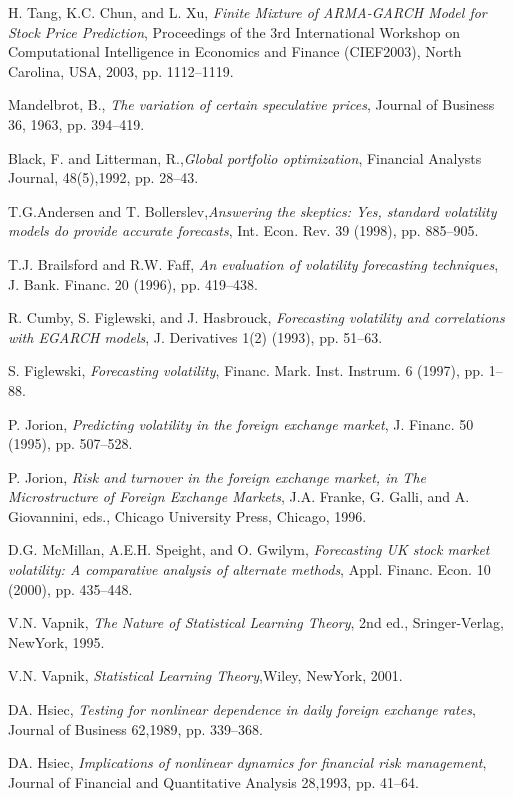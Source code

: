\begin{thebibliography}{9}
H. Tang, K.C. Chun, and L. Xu, \textit{Finite Mixture of ARMA-GARCH Model for Stock Price Prediction}, Proceedings of the 3rd International Workshop on Computational Intelligence in Economics and Finance (CIEF2003), North
Carolina, USA, 2003, pp. 1112–1119.

Mandelbrot, B., \textit{The variation of certain speculative prices}, Journal of Business 36, 1963, pp. 394–419.

Black, F. and Litterman, R.,\textit{Global portfolio optimization}, Financial Analysts Journal, 48(5),1992, pp. 28–43.

T.G.Andersen and T. Bollerslev,\textit{Answering the skeptics: Yes, standard volatility models do provide accurate forecasts}, Int. Econ. Rev. 39 (1998), pp. 885–905.

T.J. Brailsford and R.W. Faff, \textit{An evaluation of volatility forecasting techniques}, J. Bank. Financ. 20 (1996), pp. 419–438.

R. Cumby, S. Figlewski, and J. Hasbrouck, \textit{Forecasting volatility and correlations with EGARCH models}, J. Derivatives 1(2) (1993), pp. 51–63.

S. Figlewski, \textit{Forecasting volatility}, Financ. Mark. Inst. Instrum. 6 (1997), pp. 1–88.

P. Jorion, \textit{Predicting volatility in the foreign exchange market}, J. Financ. 50 (1995), pp. 507–528.

 P. Jorion, \textit{Risk and turnover in the foreign exchange market, in The Microstructure of Foreign Exchange Markets}, J.A. Franke, G. Galli, and A. Giovannini, eds., Chicago University Press, Chicago, 1996.

D.G. McMillan, A.E.H. Speight, and O. Gwilym, \textit{Forecasting UK stock market volatility: A comparative analysis of alternate methods}, Appl. Financ. Econ. 10 (2000), pp. 435–448.

V.N. Vapnik, \textit{The Nature of Statistical Learning Theory}, 2nd ed., Sringer-Verlag, NewYork, 1995.


V.N. Vapnik, \textit{Statistical Learning Theory},Wiley, NewYork, 2001.

DA. Hsiec, \textit{Testing for nonlinear dependence in daily foreign exchange rates}, Journal of Business 62,1989, pp. 339–368.

DA. Hsiec, \textit{Implications of nonlinear dynamics for financial risk management}, Journal of Financial and Quantitative Analysis 28,1993, pp. 41–64.


\end{thebibliography}
